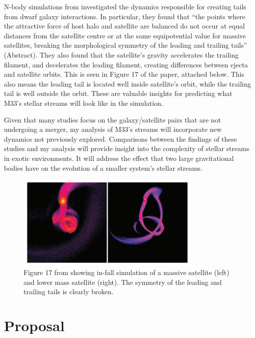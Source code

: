 \documentclass{aastex62}
\begin{document}
N-body simulations from \cite{10.1111/j.1365-2966.2007.12313.x} investigated the dynamics responsible for creating tails from dwarf galaxy interactions. In particular, they found that ``the points where the attractive force of host halo and satellite are balanced do not occur at equal distances from the satellite centre or at the same equipotential value for massive satellites, breaking the morphological symmetry of the leading and trailing tails'' (Abstract). They also found that the satellite's gravity accelerates the trailing filament, and decelerates the leading filament, creating differences between ejecta and satellite orbits. This is seen in Figure 17 of the paper, attached below. This also means the leading tail is located well inside satellite's orbit, while the trailing tail is well outside the orbit. These are valuable insights for predicting what M33's stellar streams will look like in the simulation.

Given that many studies focus on the galaxy/satellite pairs that are not undergoing a merger, my analysis of M33's streams will incorporate new dynamics not previously explored. Comparisons between the findings of these studies and my analysis will provide insight into the complexity of stellar streams in exotic environments. It will address the effect that two large gravitational bodies have on the evolution of a smaller system's stellar streams.

\begin{figure}[htp]
    \centering
    \includegraphics[width=9cm]{choi_fig17.png}
    \caption{Figure 17 from \cite{10.1111/j.1365-2966.2007.12313.x} showing in-fall simulation of a massive satellite (left) and lower mass satellite (right). The symmetry of the leading and trailing tails is clearly broken.}
    \label{fig:galaxy}
\end{figure}

\section{Proposal} \label{sec:Proposal}
\end{document}
